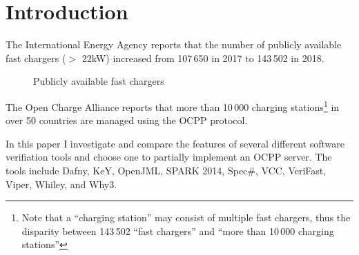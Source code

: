 \documentclass[12pt,openany,a4paper]{book}
\begin{document}
\chapter{Introduction}



The International Energy Agency \cite{GlobalEVOutlook2019} reports that the number of publicly available fast chargers ($>$ 22kW) increased from 107\,650 in 2017 to 143\,502 in 2018.\\

\begin{figure}[htbp]
\caption{Publicly available fast chargers}


\end{figure}


The Open Charge Alliance \cite{ocaappraisal} reports that more than 10\,000 charging stations\footnote{Note that a ``charging station'' may consist of multiple fast chargers, thus the disparity between 143\,502 ``fast chargers'' and ``more than 10\,000 charging stations''} in over 50 countries are managed using the OCPP protocol.


 
In this paper I investigate and compare the features of several different software verifiation tools and choose one to partially implement an OCPP server. The tools include Dafny, KeY, OpenJML, SPARK 2014, Spec\#, VCC, VeriFast, Viper, Whiley, and Why3.
\end{document}
